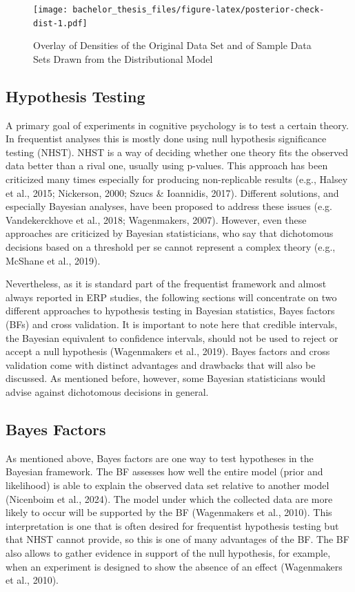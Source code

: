 \documentclass[
  doc,12pt,floatsintext]{apa7}
\begin{document}
\begin{figure}
\centering
\texttt{[image: bachelor\_thesis\_files/figure-latex/posterior-check-dist-1.pdf]}
\caption{\label{fig:posterior-check-dist}Overlay of Densities of the Original Data Set and of Sample Data Sets Drawn from the Distributional Model}
\end{figure}

\subsection{Hypothesis Testing}\label{hypothesis-testing}

A primary goal of experiments in cognitive psychology is to test a certain theory. In frequentist analyses this is mostly done using null hypothesis significance testing (NHST). NHST is a way of deciding whether one theory fits the observed data better than a rival one, usually using p-values. This approach has been criticized many times especially for producing non-replicable results (e.g., Halsey et al., 2015; Nickerson, 2000; Szucs \& Ioannidis, 2017). Different solutions, and especially Bayesian analyses, have been proposed to address these issues (e.g. Vandekerckhove et al., 2018; Wagenmakers, 2007). However, even these approaches are criticized by Bayesian statisticians, who say that dichotomous decisions based on a threshold per se cannot represent a complex theory (e.g., McShane et al., 2019).

Nevertheless, as it is standard part of the frequentist framework and almost always reported in ERP studies, the following sections will concentrate on two different approaches to hypothesis testing in Bayesian statistics, Bayes factors (BFs) and cross validation. It is important to note here that credible intervals, the Bayesian equivalent to confidence intervals, should not be used to reject or accept a null hypothesis (Wagenmakers et al., 2019). Bayes factors and cross validation come with distinct advantages and drawbacks that will also be discussed. As mentioned before, however, some Bayesian statisticians would advise against dichotomous decisions in general.

\subsection{Bayes Factors}\label{bayes-factors}

As mentioned above, Bayes factors are one way to test hypotheses in the Bayesian framework. The BF assesses how well the entire model (prior and likelihood) is able to explain the observed data set relative to another model (Nicenboim et al., 2024). The model under which the collected data are more likely to occur will be supported by the BF (Wagenmakers et al., 2010). This interpretation is one that is often desired for frequentist hypothesis testing but that NHST cannot provide, so this is one of many advantages of the BF. The BF also allows to gather evidence in support of the null hypothesis, for example, when an experiment is designed to show the absence of an effect (Wagenmakers et al., 2010).
\end{document}
